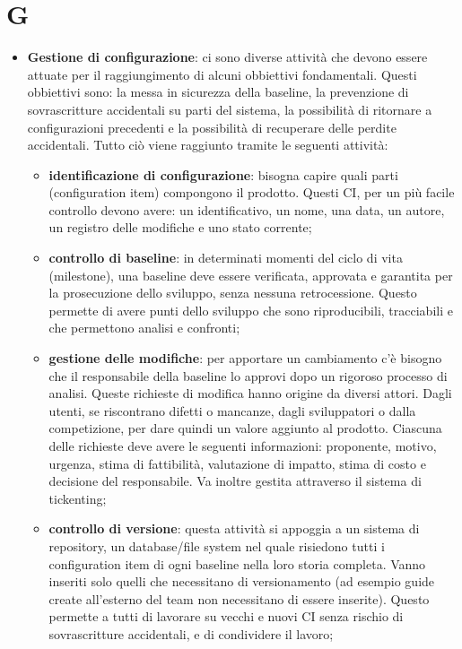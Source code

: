 %
%
%

\section{G} %
\label{sec:g}
	\begin{itemize}
		\item \textbf{Gestione di configurazione}: ci sono diverse attività che devono essere attuate per il raggiungimento di alcuni obbiettivi fondamentali. Questi obbiettivi sono: la messa in sicurezza della baseline, la prevenzione di sovrascritture accidentali su parti del sistema, la possibilità di ritornare a configurazioni precedenti e la possibilità di recuperare delle perdite accidentali. Tutto ciò viene raggiunto tramite le seguenti attività:
			\begin{itemize}
				\item \textbf{identificazione di configurazione}: bisogna capire quali parti (configuration item) compongono il prodotto. Questi CI, per un più facile controllo devono avere: un identificativo, un nome, una data, un autore, un registro delle modifiche e uno stato corrente;
				\item \textbf{controllo di baseline}: in determinati momenti del ciclo di vita (milestone), una baseline deve essere verificata, approvata e garantita per la prosecuzione dello sviluppo, senza nessuna retrocessione. Questo permette di avere punti dello sviluppo che sono riproducibili, tracciabili e che permettono analisi e confronti;
				\item \textbf{gestione delle modifiche}: per apportare un cambiamento c'è bisogno che il responsabile della baseline lo approvi dopo un rigoroso processo di analisi. Queste richieste di modifica hanno origine da diversi attori. Dagli utenti, se riscontrano difetti o mancanze, dagli sviluppatori o dalla competizione, per dare quindi un valore aggiunto al prodotto. Ciascuna delle richieste deve avere le seguenti informazioni: proponente, motivo, urgenza, stima di fattibilità, valutazione di impatto, stima di costo e decisione del responsabile. Va inoltre gestita attraverso il sistema di tickenting;
				\item \textbf{controllo di versione}: questa attività si appoggia a un sistema di repository, un database/file system nel quale risiedono tutti i configuration item di ogni baseline nella loro storia completa. Vanno inseriti solo quelli che necessitano di versionamento (ad esempio guide create all'esterno del team non necessitano di essere inserite). Questo permette a tutti di lavorare su vecchi e nuovi CI senza rischio di sovrascritture accidentali, e di condividere il lavoro;
			\end{itemize}
	\end{itemize}
